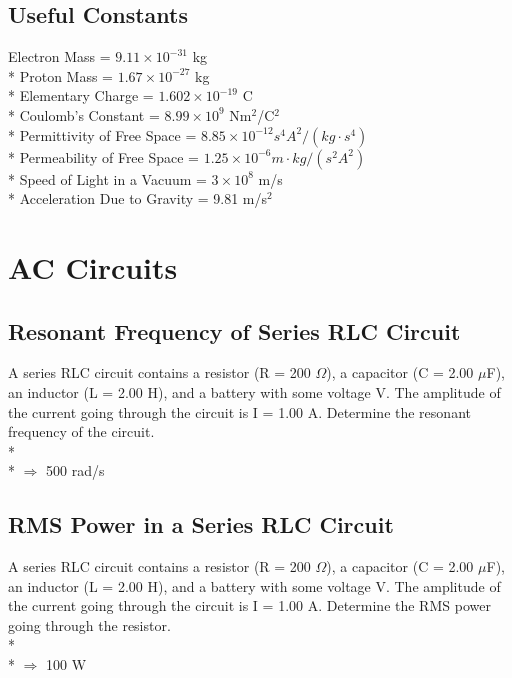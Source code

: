 \documentclass[11pt]{article}
\begin{document}
\maketitle
\tableofcontents
\vspace{50pt}

\subsection*{Useful Constants}
Electron Mass = $9.11 \times 10^{-31}$ kg \\*
Proton Mass = $1.67 \times 10^{-27}$ kg \\*
Elementary Charge = $1.602 \times 10^{-19}$ C \\*
Coulomb's Constant = $8.99 \times 10^9$ Nm$^2$/C$^2$ \\*
Permittivity of Free Space = $8.85 \times 10^{-12} s^4 A^2 / (kg \cdot s^4)$ \\*
Permeability of Free Space = $1.25 \times 10^{-6} m \cdot kg / (s^2 A^2)$ \\*
Speed of Light in a Vacuum = $3 \times 10^8$ m/s \\*
Acceleration Due to Gravity = 9.81 m/s$^2$


\pagebreak
\section{AC Circuits}
\vspace{10pt}

\subsection{Resonant Frequency of Series RLC Circuit}
A series RLC circuit contains a resistor (R = 200 $\Omega$), a capacitor (C = 2.00 $\mu$F), an inductor (L = 2.00 H), and a battery with some voltage V.  The amplitude of the current going through the circuit is I = 1.00 A.  Determine the resonant frequency of the circuit. \\* \\*
$\Rightarrow $ 500 rad/s

\subsection{RMS Power in a Series RLC Circuit}
A series RLC circuit contains a resistor (R = 200 $\Omega$), a capacitor (C = 2.00 $\mu$F), an inductor (L = 2.00 H), and a battery with some voltage V.  The amplitude of the current going through the circuit is I = 1.00 A.  Determine the RMS power going through the resistor. \\* \\*
$\Rightarrow $ 100 W
\end{document}
